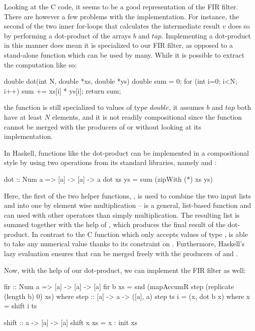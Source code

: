 \noindent Looking at the C code, it seems to be a good representation of the FIR filter. There are however a few problems with the implementation. For instance, the second of the two inner for-loops that calculates the intermediate result $v$ does so by performing a dot-product of the arrays $b$ and $tap$. Implementing a dot-product in this manner does mean it is specialized to our FIR filter, as opposed to a stand-alone function which can be used by many. While it is possible to extract the computation like so:

\begin{code}
double dot(int N, double *xs, double *ys)
{
  double sum = 0;
  for (int i=0; i<N; i++) sum += xs[i] * ys[i];
  return sum;
}
\end{code}

\noindent the function is still specialized to values of type $double$, it assumes $b$ and $tap$ both have at least $N$ elements, and it is not readily compositional since the function cannot be merged with the producers of  or  without looking at its implementation.

In Haskell, functions like the dot-product can be implemented in a compositional style by using two operations from its standard libraries, namely  and :

\begin{code}
dot :: Num a => [a] -> [a] -> a
dot xs ys = sum (zipWith (*) xs ys)
\end{code}

\noindent Here, the first of the two helper functions, , is used to combine the two input lists  and  into one by element wise multiplication --  is a general, list-based function and can used with other operators than simply multiplication. The resulting list is summed together with the help of , which produces the final result of the dot-product. In contrast to the C function which only accepts values of type ,  is able to take any numerical value thanks to its  constraint on . Furthermore, Haskell's lazy evaluation ensures that  can be merged freely with the producers of  and .

Now, with the help of our dot-product, we can implement the FIR filter as well:

\begin{code}
fir :: Num a => [a] -> [a] -> [a]
fir b xs = snd (mapAccumR step (replicate (length b) 0) xs)
  where
    step :: [a] -> a -> ([a], a)
    step ts i = (x, dot b x)
      where x = shift i ts
  
    shift :: a -> [a] -> [a]
    shift x xs = x : init xs
\end{code}


